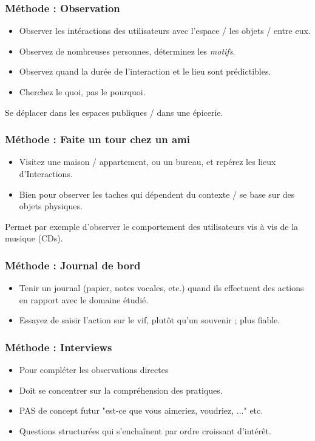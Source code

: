 \documentclass{beamer}
\begin{document}
\begin{frame}
\frametitle{Méthode : Observation}

\begin{itemize}
	\item Observer les intéractions des utilisateurs avec l'espace / les objets / entre eux.
	\item Observez de nombreuses personnes, déterminez les \emph{motifs}.
	\item Observez quand la durée de l'interaction et le lieu sont prédictibles.
	\item Cherchez le quoi, pas le pourquoi.
\end{itemize}

Se déplacer dans les espaces publiques / dans une épicerie.
\end{frame}

\begin{frame}
\frametitle{Méthode : Faite un tour chez un ami}
\begin{itemize}
	\item Visitez une maison / appartement, ou un bureau, et repérez les lieux d’Interactions.
	\item Bien pour observer les taches qui dépendent du contexte / se base sur des objets physiques.
\end{itemize}

Permet par exemple d'observer le comportement des utilisateurs vis à vis de la musique (CDs).
\end{frame}

\begin{frame}
\frametitle{Méthode : Journal de bord}
\begin{itemize}
	\item Tenir un journal (papier, notes vocales, etc.) quand ils effectuent des actions en rapport avec le domaine étudié.
	\item Essayez de saisir l'action sur le vif, plutôt qu'un souvenir ; plus fiable.
\end{itemize}
\end{frame}

\begin{frame}
\frametitle{Méthode : Interviews}

\begin{itemize}
	\item Pour compléter les observations directes
	\item Doit se concentrer sur la compréhension des pratiques.
	\item PAS de concept futur "est-ce que vous aimeriez, voudriez, ..." etc.
	\item Questions structurées qui s’enchaînent par ordre croissant d’intérêt.
\end{itemize}
\end{frame}
\end{document}
